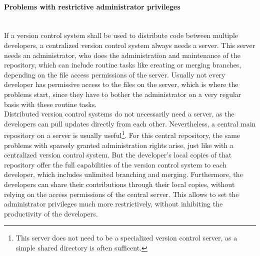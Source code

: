 			\paragraph{Problems with restrictive administrator privileges}~\\
				If a version control system shall be used to distribute code between multiple developers, a centralized version control system always needs a server.
				This server needs an administrator, who does the administration and maintenance of the repository, which can include routine tasks like creating or merging branches, depending on the file access permissions of the server.
				Usually not every developer has permissive access to the files on the server, which is where the problems start, since they have to bother the administrator on a very regular basis with these routine tasks.\\
				Distributed version control systems do not necessarily need a server, as the developers can pull updates directly from each other.
				Nevertheless, a central main repository on a server is usually useful\footnote{This server does not need to be a specialized version control server, as a simple shared directory is often sufficent.}.
				For this central repository, the same problems with sparsely granted administration rights arise, just like with a centralized version control system.
				But the developer's local copies of that repository offer the full capabilities of the version control system to each developer, which includes unlimited branching and merging.
				Furthermore, the developers can share their contributions through their local copies, without relying on the access permissions of the central server.
				This allows to set the administrator privileges much more restrictively, without inhibiting the productivity of the developers.

